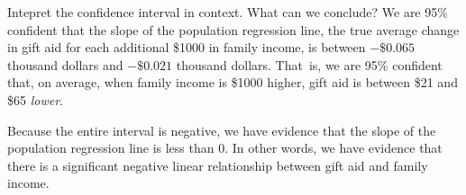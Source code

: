 \begin{examplewrap}
\begin{nexample}
{Intepret the confidence interval in context.  What can we conclude?}
We are 95\% confident that the slope of the population regression line, the true average change in gift aid for each additional \$1000 in family income, is between $-\$0.065$ thousand dollars and $-\$0.021$ thousand dollars.  That~is, we are 95\% confident that, on average, when family income is \$1000 higher, gift aid is between \$21 and \$65 \emph{lower}.  

Because the entire interval is negative, we have evidence that the slope of the population regression line is less than 0.  In other words, we have evidence that there is a significant negative linear relationship between gift aid and family income.
\end{nexample}
\end{examplewrap}

